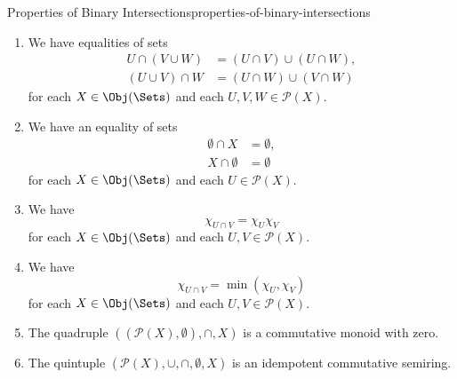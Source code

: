 \begin{proposition}{Properties of Binary Intersections}{properties-of-binary-intersections}
\begin{enumerate}
        \item\label{properties-of-binary-intersections-distributivity-over-unions}We have equalities of sets
            \begin{align*}
                U\cap(V\cup W)  &= (U\cap V)\cup(U\cap W),\\
                (U\cup V)\cap W &= (U\cap W)\cup(V\cap W)
            \end{align*}
            for each $X\in\Obj(\Sets)$ and each $U,V,W\in\mathcal{P}(X)$.
        \item\label{properties-of-binary-intersections-annihilation-with-the-empty-set}We have an equality of sets
            \begin{align*}
                \emptyset\cap X &= \emptyset,\\
                X\cap\emptyset  &= \emptyset
            \end{align*}
            for each $X\in\Obj(\Sets)$ and each $U\in\mathcal{P}(X)$.
        \item\label{properties-of-binary-intersections-interaction-with-characteristic-functions-1}We have
            \[
                \chi_{U\cap V}%
                =%
                \chi_{U}\chi_{V}%
            \]%
            for each $X\in\Obj(\Sets)$ and each $U,V\in\mathcal{P}(X)$.
        \item\label{properties-of-binary-intersections-interaction-with-characteristic-functions-2}We have
            \[
                \chi_{U\cap V}%
                =%
                \min(\chi_{U},\chi_{V})%
            \]%
            for each $X\in\Obj(\Sets)$ and each $U,V\in\mathcal{P}(X)$.
        \item\label{properties-of-binary-intersections-interaction-with-powersets-and-monoids-with-zero}The quadruple $((\mathcal{P}(X),\emptyset),\cap,X)$ is a commutative monoid with zero.
        \item\label{properties-of-binary-intersections-interaction-with-powersets-and-semirings}The quintuple $(\mathcal{P}(X),\cup,\cap,\emptyset,X)$ is an idempotent commutative semiring.
    \end{enumerate}
\end{proposition}
